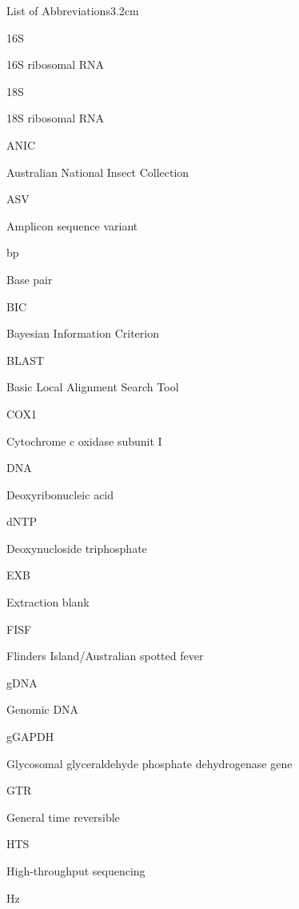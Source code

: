\documentclass[a4paper, nobind]{templates/ociamthesis}
\begin{document}
\begin{romanpages}
\begin{mclistof}{List of Abbreviations}{3.2cm}
\item[16S]

16S ribosomal RNA

\item[18S]

18S ribosomal RNA

\item[ANIC]

Australian National Insect Collection

\item[ASV]

Amplicon sequence variant

\item[bp]

Base pair

\item[BIC]

Bayesian Information Criterion

\item[BLAST]

Basic Local Alignment Search Tool

\item[COX1]

Cytochrome c oxidase subunit I

\item[DNA]

Deoxyribonucleic acid

\item[dNTP]

Deoxynucloside triphosphate

\item[EXB]

Extraction blank

\item[FISF]

Flinders Island/Australian spotted fever

\item[gDNA]

Genomic DNA

\item[gGAPDH]

Glycosomal glyceraldehyde phosphate dehydrogenase gene

\item[GTR]

General time reversible

\item[HTS]

High-throughput sequencing

\item[Hz]


\end{mclistof}
\end{romanpages}
\end{document}
